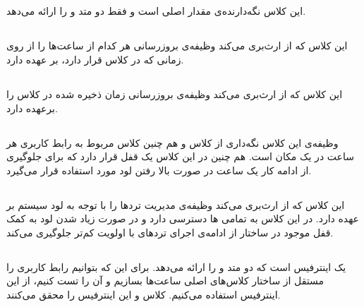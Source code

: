 \documentclass[oneside,a4paper,11pt]{report}
\begin{document}
\subsection{}

این کلاس نگه‌دارنده‌ی مقدار اصلی  است و فقط دو متد 
و 
را ارائه می‌دهد.

\subsection{}


این کلاس که از 
ارث‌بری می‌کند وظیفه‌ی بروزرسانی هر کدام از ساعت‌ها را از روی زمانی که در کلاس 
قرار دارد، بر عهده دارد.

\subsection{}


این کلاس که از 
ارث‌بری می‌کند وظیفه‌ی بروزرسانی زمان ذخیره شده در کلاس 
را برعهده دارد.

\subsection{}
وظیفه‌ی این کلاس نگه‌داری از کلاس 
و هم چنین کلاس مربوط به رابط کاربری هر ساعت در یک مکان است. هم چنین در این کلاس یک قفل قرار دارد که برای جلوگیری از ادامه کار یک ساعت در صورت بالا رفتن لود 
مورد استفاده قرار می‌گیرد.

\subsection{}

این کلاس که از 
ارث‌بری می‌کند
وظیفه‌‌ی مدیریت تردها را با توجه به لود سیستم بر عهده دارد. در این کلاس به تمامی
ها دسترسی دارد و در صورت زیاد شدن لود
به کمک قفل موجود در ساختار
از ادامه‌ی اجرای تردهای با اولویت کم‌تر جلوگیری می‌کند.

\subsection{}

یک اینترفیس است که دو متد 
و
را ارائه می‌دهد. برای این که بتوانیم رابط کاربری را مستقل از ساختار کلاس‌های اصلی ساعت‌ها بسازیم و آن را تست کنیم، از این اینترفیس استفاده می‌کنیم.
کلاس
و
این اینترفیس را محقق می‌کنند.
\end{document}
